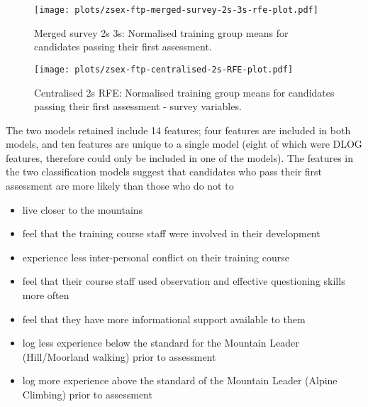 \documentclass[
  12pt,
  a4paper,
]{book}
\providecommand{\tightlist}{%
  \setlength{\itemsep}{0pt}\setlength{\parskip}{0pt}}
\begin{document}
\begin{figure}
\centering
\texttt{[image: plots/zsex-ftp-merged-survey-2s-3s-rfe-plot.pdf]}
\caption{\label{fig:zsex-ftp-merged-survey-2s-3s-rfe-plot}Merged survey 2s 3s: Normalised training group means for candidates passing their first assessment.}
\end{figure}

\begin{figure}
\centering
\texttt{[image: plots/zsex-ftp-centralised-2s-RFE-plot.pdf]}
\caption{\label{fig:zsex-ftp-centralised-2s-RFE-plot}Centralised 2s RFE: Normalised training group means for candidates passing their first assessment - survey variables.}
\end{figure}

The two models retained include 14 features; four features are included in both models, and ten features are unique to a single model (eight of which were DLOG features, therefore could only be included in one of the models). The features in the two classification models suggest that candidates who pass their first assessment are more likely than those who do not to

\begin{itemize}
\tightlist
\item
  live closer to the mountains
\item
  feel that the training course staff were involved in their development
\item
  experience less inter-personal conflict on their training course
\item
  feel that their course staff used observation and effective questioning skills more often
\item
  feel that they have more informational support available to them
\item
  log less experience below the standard for the Mountain Leader (Hill/Moorland walking) prior to assessment
\item
  log more experience above the standard of the Mountain Leader (Alpine Climbing) prior to assessment
\end{itemize}
\end{document}
